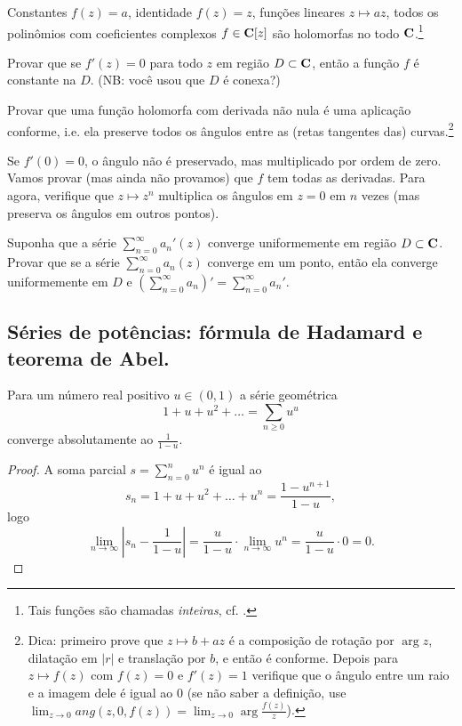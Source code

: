 \begin{exem}
Constantes $f(z) = a$,
identidade $f(z) = z$,
funções lineares $z \mapsto a z$,
todos os polinômios com coeficientes complexos $f \in \mathbf{C}[z]$
são holomorfas no todo $\mathbf{C}$.\footnote{Tais funções são chamadas \emph{inteiras}, cf. .}
\end{exem}

\begin{problema}
Provar que se $f'(z)=0$ para todo $z$ em região $D\subset \mathbf{C}$, então a função $f$ é constante na $D$.
(NB: você usou que $D$ é conexa?)
\end{problema}

\begin{problema}
Provar que uma função holomorfa com derivada não nula é uma aplicação conforme,
i.e. ela preserve todos os ângulos entre as (retas tangentes das) curvas.\footnote{Dica:
primeiro prove que $z \mapsto b+ a z$ é a composição de rotação por $\arg z$, dilatação em $|r|$
e translação por $b$, e então é conforme.
Depois para $z \mapsto f(z)$ com $f(z) = 0$ e $f'(z)=1$ verifique que o ângulo entre um raio e a imagem dele
é igual ao $0$ (se não saber a definição, use $\lim_{z\to 0} ang(z,0,f(z)) = \lim_{z\to 0} \arg \frac{f(z)}{z}$).
}
\end{problema}

Se $f'(0)=0$, o ângulo não é preservado, mas multiplicado por ordem de zero. Vamos provar (mas ainda não provamos) que $f$ tem todas as derivadas. Para agora, verifique que $z\mapsto z^n$ multiplica os ângulos em $z=0$ em $n$ vezes
(mas preserva os ângulos em outros pontos).


\begin{problema}
\label{pre-weierstrass}
Suponha que a série $\sum_{n=0}^\infty a_n'(z)$ converge uniformemente em região $D\subset \mathbf{C}$.
Provar que se a série $\sum_{n=0}^\infty a_n(z)$ converge em um ponto,
então ela converge uniformemente em $D$ e $(\sum_{n=0}^\infty a_n)' = \sum_{n=0}^\infty a_n'$.
\end{problema}


\subsection{Séries de potências: fórmula de Hadamard e teorema de Abel.}

\begin{prop}
Para um número real positivo $u\in(0,1)$ a série geométrica
\[ 1 + u + u^2 + \dots = \sum_{n\geq 0} u^u \]
converge absolutamente ao $\frac{1}{1-u}$.
\end{prop}
\begin{proof}
A soma parcial $s = \sum_{n=0}^n u^n$ é igual ao
\[ s_n = 1 + u + u^2 + \dots + u^n = \frac{1-u^{n+1}}{1-u}, \]
logo
\[ \lim_{n\to\infty} |s_n - \frac{1}{1-u}|
 = \frac{u}{1-u} \cdot \lim_{n\to\infty} u^n
 = \frac{u}{1-u} \cdot 0 = 0. \]
\end{proof}

